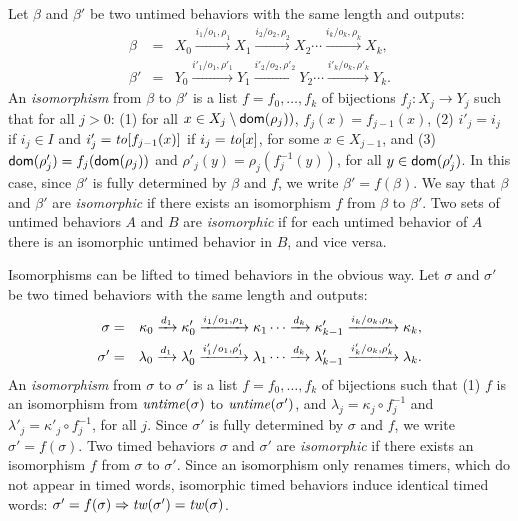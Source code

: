 Let $\beta$ and $\beta'$ be two untimed behaviors with the same length and outputs:
\begin{eqnarray*}
\beta & = & X_0 \xrightarrow{i_1/o_1, \rho_1} X_1  \xrightarrow{i_2/o_2, \rho_2} X_2 \cdots \xrightarrow{i_k/o_k, \rho_k} X_{k},\\
\beta' & = & Y_0 \xrightarrow{i'_1/o_1, \rho'_1} Y_1  \xrightarrow{i'_2/o_2, \rho'_2} Y_2 \cdots \xrightarrow{i'_k/o_k, \rho'_k} Y_{k}.
\end{eqnarray*}
An \emph{isomorphism} from $\beta$ to $\beta'$ is a list $f = f_0 ,\ldots, f_k$ of bijections $f_j : X_j \rightarrow Y_j$ such that
for all $j>0$: (1) for all $x \in X_j \setminus {\textsf{dom}}(\rho_j))$, $f_j(x)=f_{j-1}(x)$,
(2) $i'_j = i_j$ if $i_j \in I$ and $i'_j = \mathit{to}[f_{j-1}(x)]$ if $i_j = \mathit{to}[x]$, for some $x \in X_{j-1}$, and
(3) ${\textsf{dom}}(\rho'_j) = f_j({\textsf{dom}}(\rho_j))$ and $\rho'_j(y) = \rho_j ( f_j^{-1}(y))$, for all $y\in{\textsf{dom}}(\rho'_j)$.
In this case, since $\beta'$ is fully determined by $\beta$ and $f$, we write $\beta' = f(\beta)$.
We say that $\beta$ and $\beta'$ are \emph{isomorphic} if there exists an isomorphism $f$ from $\beta$ to $\beta'$.
Two sets of untimed behaviors $A$ and $B$ are \emph{isomorphic} if for each untimed behavior of $A$ there is an isomorphic untimed behavior in $B$,
and vice versa.

Isomorphisms can be lifted to timed behaviors in the obvious way. 
Let $\sigma$ and $\sigma'$ be two timed behaviors with the same length and outputs:
\begin{eqnarray*}
\sigma & = & \kappa_0 \xrightarrow{d_1} \kappa'_0 \xrightarrow{i_1/o_1, \rho_1} \kappa_1  \cdots
\xrightarrow{d_k} \kappa'_{k-1} \xrightarrow{i_k/o_k, \rho_k} \kappa_{k},\\
\sigma' & = & \lambda_0 \xrightarrow{d_1} \lambda'_0 \xrightarrow{i'_1/o_1, \rho'_1} \lambda_1  \cdots
\xrightarrow{d_k} \lambda'_{k-1} \xrightarrow{i'_k/o_k, \rho'_k} \lambda_{k}.
\end{eqnarray*}
An \emph{isomorphism} from $\sigma$ to $\sigma'$ is a list $f = f_0 ,\ldots, f_k$ of bijections such that
(1) $f$ is an isomorphism from $\mathit{untime}(\sigma)$ to $\mathit{untime}(\sigma')$, and
$\lambda_j = \kappa_j \circ f_j^{-1}$ and $\lambda'_j = \kappa'_j \circ f_j^{-1}$, for all $j$.
Since $\sigma'$ is fully determined by $\sigma$ and $f$, we write $\sigma' = f(\sigma)$.
Two timed behaviors $\sigma$ and $\sigma'$ are \emph{isomorphic} if there exists an isomorphism $f$ from $\sigma$ to $\sigma'$.
Since an isomorphism only renames timers, which do not appear in timed words, 
isomorphic timed behaviors induce identical timed words: $\sigma' = f(\sigma) \Rightarrow \mathit{tw}(\sigma') = \mathit{tw}(\sigma)$.

